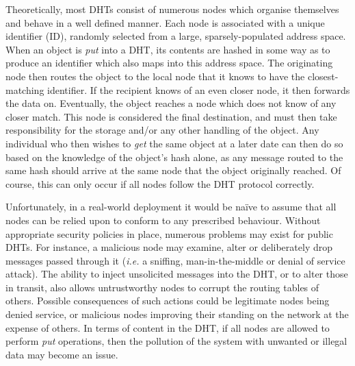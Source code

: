 \documentclass[times, 10pt,twocolumn]{article}
\begin{document}
Theoretically, most DHTs consist of numerous nodes which organise
themselves and behave in a well defined manner. Each node is
associated with a unique identifier (ID), randomly selected from a
large, sparsely-populated address space. When an object is
\emph{put} into a DHT, its contents are hashed in some way as to
produce an identifier which also maps into this address space. The
originating node then routes the object to the local node that it
knows to have the closest-matching identifier. If the recipient
knows of an even closer node, it then forwards the data on.
Eventually, the object reaches a node which does not know of any
closer match. This node is considered the final destination, and
must then take responsibility for the storage and/or any other
handling of the object. Any individual who then wishes to \emph{get}
the same object at a later date can then do so based on the
knowledge of the object's hash alone, as any message routed to the
same hash should arrive at the same node that the object originally
reached. Of course, this can only occur if all nodes follow the DHT
protocol correctly.

Unfortunately, in a real-world deployment it would be na\"ive to assume
that all nodes can be relied upon to conform to any prescribed
behaviour. Without appropriate security policies in place, numerous
problems may exist for public DHTs. For instance, a malicious node may
examine, alter or deliberately drop messages passed through it
(\emph{i.e.} a sniffing, man-in-the-middle or denial of service
attack). The ability to inject unsolicited messages into the DHT, or to
alter those in transit, also allows untrustworthy nodes to corrupt the
routing tables of others. Possible consequences of such actions could
be legitimate nodes being denied service, or malicious nodes improving
their standing on the network at the expense of others. In terms of
content in the DHT, if all nodes are allowed to perform \emph{put}
operations, then the pollution of the system with unwanted
or illegal data may become an issue. %
\end{document}
